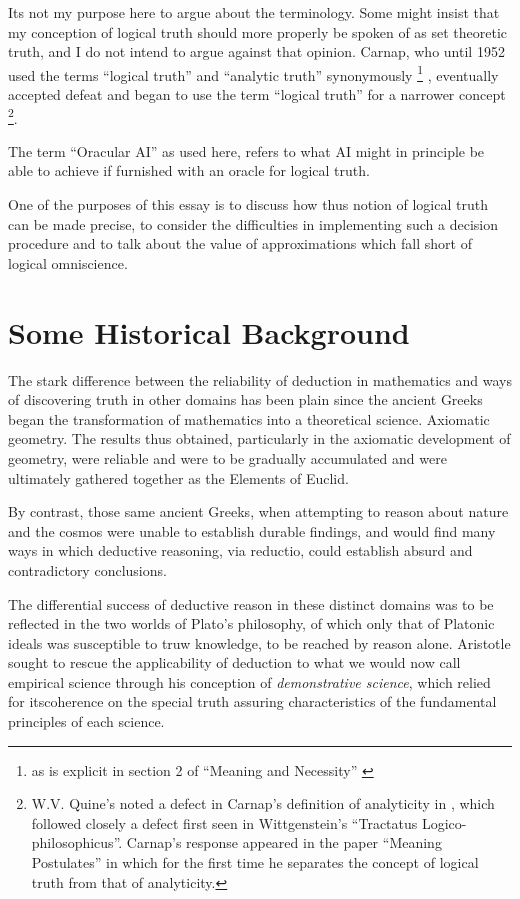 \documentclass[10pt,titlepage]{book}
\begin{document}
Its not my purpose here to argue about the terminology.
Some might insist that my conception of logical truth should more properly be spoken of as set theoretic truth, and I do not intend to argue against that opinion.
Carnap, who until 1952 used the terms ``logical truth'' and ``analytic truth'' synonymously %
\footnote{as is explicit in section 2 of ``Meaning and Necessity'' \cite{carnap56}}%
, eventually accepted defeat and began to use the term ``logical truth'' for a narrower concept%
\footnote{W.V. Quine's noted a defect in Carnap's definition of analyticity in \cite{carnap56}, which followed closely a defect first seen in Wittgenstein's ``Tractatus Logico-philosophicus''\cite{Wittgenstein1921}.
Carnap's response appeared in the paper ``Meaning Postulates''\cite{carnap52} in which for the first time he separates the concept of logical truth from that of analyticity.}.

The term ``Oracular AI'' as used here, refers to what AI might in principle be able to achieve if furnished with an oracle for logical truth.

One of the purposes of this essay is to discuss how thus notion of logical truth can be made precise, to consider the difficulties in implementing such a decision procedure and to talk about the value of approximations which fall short of logical omniscience.

\section{Some Historical Background}

The stark difference between the reliability of deduction in mathematics and ways of discovering truth in other domains has been plain since the ancient Greeks began the transformation of mathematics into a theoretical science.
Axiomatic geometry.
The results thus obtained, particularly in the axiomatic development of geometry, were reliable and were to be gradually accumulated and were ultimately gathered together as the Elements of Euclid.

By contrast, those same ancient Greeks, when attempting to reason about nature and the cosmos were unable to establish durable findings, and would find many ways in which deductive reasoning, via reductio, could establish absurd and contradictory conclusions.

The differential success of deductive reason in these distinct domains was to be reflected in the two worlds of Plato's philosophy, of which only that of Platonic ideals was susceptible to truw knowledge, to be reached by reason alone.
Aristotle sought to rescue the applicability of deduction to what we would now call empirical science through his conception of \emph{demonstrative science}, which relied for itscoherence on the special truth assuring characteristics of the fundamental principles of each science.
\end{document}
